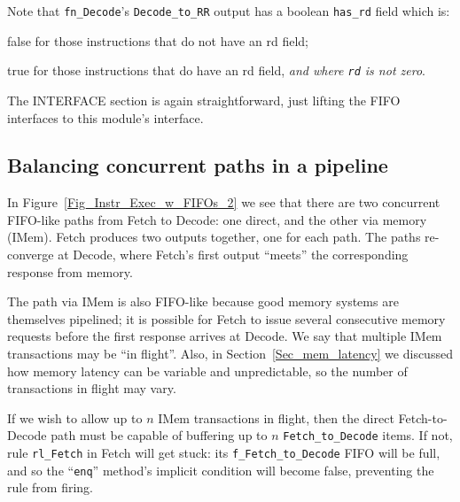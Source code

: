 Note that \verb|fn_Decode|'s \verb|Decode_to_RR| output has a boolean
\verb|has_rd| field which is:

\begin{tightlist}
 \item false for those instructions that do not have an rd field;

 \item true for those instructions that do have an rd field, \emph{and
       where {\tt rd} is not zero}.
\end{tightlist}

The INTERFACE section is again straightforward, just lifting the FIFO
interfaces to this module's interface.


\subsection{Balancing concurrent paths in a pipeline}

\label{Sec_Balancing}


In Figure~\ref{Fig_Instr_Exec_w_FIFOs_2} we see that there are two
concurrent FIFO-like paths from Fetch to Decode: one direct, and the
other via memory (IMem).  Fetch produces two outputs together, one for
each path.  The paths re-converge at Decode, where Fetch's first
output ``meets'' the corresponding response from memory.


The path via IMem is also FIFO-like because good memory systems are
themselves pipelined; it is possible for Fetch to issue several
consecutive memory requests before the first response arrives at
Decode.  We say that multiple IMem transactions may be ``in flight''.
Also, in Section~\ref{Sec_mem_latency} we discussed how memory latency
can be variable and unpredictable, so the number of transactions in
flight may vary.

If we wish to allow up to $n$ IMem transactions in flight, then the
direct Fetch-to-Decode path must be capable of buffering up to $n$
\verb|Fetch_to_Decode| items.  If not, rule \verb|rl_Fetch| in Fetch
will get stuck: its \verb|f_Fetch_to_Decode| FIFO will be full, and so
the ``\verb|enq|'' method's implicit condition will become false,
preventing the rule from firing.

